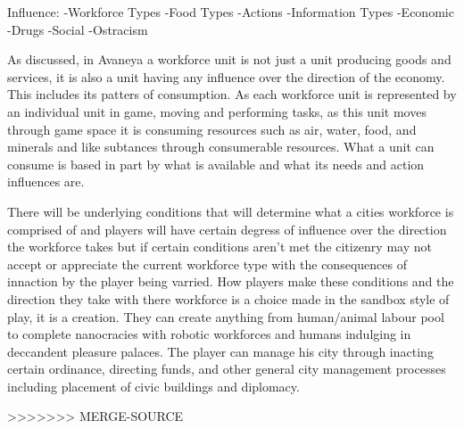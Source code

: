 Influence:
-Workforce Types
-Food Types
-Actions
-Information Types
-Economic 
-Drugs
-Social
-Ostracism



%
%
%
%
%
%
%





As discussed, in Avaneya a workforce unit is not just a unit producing goods and services, it is also a unit having any influence over the direction of the economy. This includes its patters of consumption. As each workforce unit is represented by an individual unit in game, moving and performing tasks, as this unit moves through game space it is consuming resources such as air, water, food, and minerals and like subtances through consumerable resources. What a unit can consume is based in part by what is available and what its needs and action influences are.



 



There will be underlying conditions that will determine what a cities workforce is comprised of and players will have certain degress of influence over the direction the workforce takes but if certain conditions aren't met the citizenry may not accept or appreciate the current workforce type with the consequences of innaction by the player being varried. How players make these conditions and the direction they take with there workforce is a choice made in the sandbox style of play, it is a creation. They can create anything from human/animal labour pool to complete nanocracies with robotic workforces and humans indulging in deccandent pleasure palaces. The player can manage his city through inacting certain ordinance, directing funds, and other general city management processes including placement of civic buildings and diplomacy. 







>>>>>>> MERGE-SOURCE
